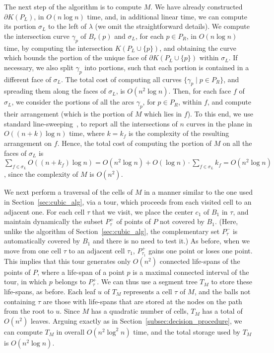 \documentclass[a4paper,12pt]{article}
\def\bd{{\partial}}
\begin{document}
\smallskip
{} The next step of the
algorithm is to compute $M$. We have already constructed
$\bd{K(P_L)}$, in $O(n \log n)$ time, and, in additional linear
time, we can compute its portion $\sigma_L$ to the left of $\lambda$
(we omit the straightforward details). We compute the intersection
curve $\gamma_p$ of $B_r(p)$ and $\sigma_L$, for each $p \in P_R$,
in $O(n \log n)$ time, by computing the intersection $K(P_L \cup
\{p\})$, and obtaining the curve which bounds the portion of the
unique face of $\bd{K(P_L \cup \{p\})}$ within $\sigma_L$. If
necessary, we also split $\gamma_p$ into portions, such that each
portion is contained in a different face of $\sigma_L$. The total
cost of computing all curves $\{\gamma_p \mid p \in P_R\}$, and
spreading them along the faces of $\sigma_L$, is $O(n^2 \log n)$.
Then, for each face $f$ of $\sigma_L$, we consider the portions of
all the arcs $\gamma_p$, for $p \in P_R$, within $f$, and compute
their arrangement (which is the portion of $M$ which lies in $f$).
To this end, we use standard line-sweeping~\cite{book}, to report
all the intersections of $n$ curves in the plane in $O((n+k) \log
n)$ time, where $k = k_f$ is the complexity of the resulting
arrangement on $f$. Hence, the total cost of computing the portion
of $M$ on all the faces of $\sigma_L$ is $\sum_{f \in \sigma_L}
O((n+k_f) \log n) = O(n^2 \log n) + O(\log n) \cdot \sum_{f \in
\sigma_L} k_f = O(n^2 \log n)$, since the complexity of $M$ is
$O(n^2)$.

We next perform a traversal of the cells of $M$ in a manner similar to the one used in Section~\ref{sec:cubic_alg}, via a tour, which proceeds from each visited cell to an adjacent one. For each cell $\tau$ that we visit, we place
the center $c_1$ of $B_1$ in $\tau$, and maintain dynamically the subset
$P_\tau^+$ of points of $P$ not covered by $B_1$. (Here, unlike the algorithm of Section~\ref{sec:cubic_alg}, the complementary set  $P_\tau^-$ is automatically covered by $B_1$ and there is no need to test it.) As before,
when we move
from one cell $\tau$ to an adjacent cell $\tau_1$, $P_{\tau_1}^+$ gains
one point or loses one point. This implies that this tour generates only $O(n^2)$ connected life-spans of the points of $P$, where a life-span of a point $p$ is a maximal connected interval of the tour, in which $p$ belongs to $P_\tau^+$. We can thus use a segment tree $T_M$ to store these life-spans, as before. Each
leaf $u$ of $T_M$ represents a cell $\tau$ of $M$, and the balls not containing $\tau$ are those with life-spans that are stored at the nodes on the path from the root to $u$. Since $M$ has a quadratic number of
cells, $T_M$ has a total
of $O(n^2)$ leaves. Arguing exactly as in Section~\ref{subsec:decision_procedure}, we can compute $T_M$ in overall $O(n^2 \log^2 n)$ time, and the total storage used by $T_M$ is $O(n^2 \log n)$.
\end{document}
